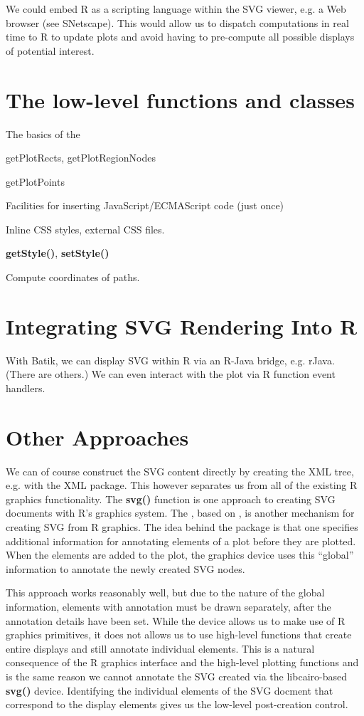\documentclass[article]{jss}
\def\Rfunc#1{\textbf{#1()}}
\begin{document}
We could embed R as a scripting language within the SVG viewer,
e.g. a Web browser (see SNetscape).  This would allow us to dispatch computations
in real time to R to update plots and avoid having to pre-compute
all possible displays of potential interest.


\section{The low-level functions and classes}
The basics of the 

getPlotRects, getPlotRegionNodes

getPlotPoints

Facilities for inserting JavaScript/ECMAScript code (just once)

Inline CSS styles, external CSS files.

\Rfunc{getStyle}, \Rfunc{setStyle}

Compute coordinates of paths.

\section{Integrating SVG Rendering Into R}
With Batik, we can display SVG within R via
an R-Java bridge, e.g. rJava. (There are others.)
We can even interact with the plot via R function 
event handlers.

\section{Other Approaches}
We can of course construct the SVG content directly by creating the
XML tree, e.g. with the XML package.  This however separates us from
all of the existing R graphics functionality.  The \Rfunc{svg}
function is one approach to creating SVG documents with R's graphics
system.  The  \cite{rsvgtipsdevice}, based on
 \cite{svgdevice}, is another mechanism for creating
SVG from R graphics.  The idea behind the  package
is that one specifies additional information for annotating elements
of a plot before they are plotted.  When the elements are added to the
plot, the graphics device uses this ``global'' information to annotate
the newly created SVG nodes.

This approach works reasonably well, but due to the nature of the
global information, elements with annotation must be drawn separately,
after the annotation details have been set.  While the device allows
us to make use of R graphics primitives, it does not allows us to use
high-level functions that create entire displays and still annotate
individual elements.  This is a natural consequence of the R graphics
interface and the high-level plotting functions and is the same reason
we cannot annotate the SVG created via the libcairo-based \Rfunc{svg}
device.  Identifying the individual elements of the SVG docment that
correspond to the display elements gives us the low-level
post-creation control.
\end{document}
